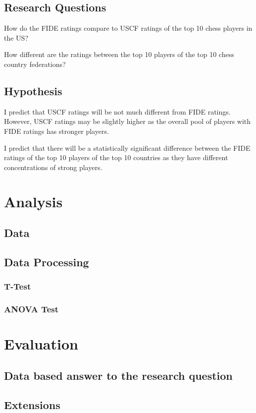 \documentclass[12pt]{article}
\begin{document}
\subsection{Research Questions}
How do the FIDE ratings compare to USCF ratings of the top 10 chess players in the US?

How different are the ratings between the top 10 players of the top 10 chess country federations?
\subsection{Hypothesis}
I predict that USCF ratings will be not much different from FIDE ratings. However, USCF ratings may be slightly higher as the overall pool of players with FIDE ratings has stronger players.

I predict that there will be a statistically significant difference between the FIDE ratings of the top 10 players of the top 10 countries as they have different concentrations of strong players. 

\section{Analysis}
\subsection{Data}
\subsection{Data Processing}
\subsubsection{T-Test}
\subsubsection{ANOVA Test}

\section{Evaluation}
\subsection{Data based answer to the research question}
\subsection{Extensions}
\end{document}
